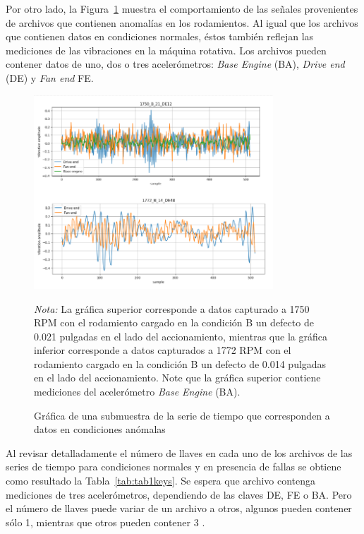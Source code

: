 \documentclass[11pt,a4paper,spanish]{book}
\numberwithin{equation}{chapter}
\numberwithin{figure}{chapter}
\begin{document}
Por otro lado, la Figura~\ref{fig:figAnomalySeries} muestra el comportamiento de las señales 
provenientes de archivos que contienen anomalías en los rodamientos. Al igual que los archivos
que contienen datos en condiciones normales, éstos también reflejan las mediciones de las 
vibraciones en la máquina rotativa. 
Los archivos pueden contener datos de uno, dos o tres acelerómetros: \textit{Base Engine} (BA), 
\textit{Drive end} (DE) y \textit{Fan end} FE.


\begin{figure}[H]
    \caption{Gráfica de una submuestra de la serie de tiempo que corresponden a datos en 
    condiciones anómalas}
    \centering
    \includegraphics[width=0.8\textwidth]{media/dataset/anomaly-series.png}
    \label{fig:figAnomalySeries}
    \parbox{\textwidth}{\footnotesize \textit{Nota:} La gráfica superior corresponde a datos
    capturado a 1750 RPM con el rodamiento cargado en la condición B un 
    defecto de 0.021 pulgadas en el lado del accionamiento, mientras que la gráfica inferior
    corresponde a datos capturados a 1772 RPM con 
    el rodamiento cargado en la condición B un defecto de 0.014 pulgadas en el lado del 
    accionamiento. Note que la gráfica superior contiene mediciones del acelerómetro 
    \textit{Base Engine} (BA). }
\end{figure}


Al revisar detalladamente el número de llaves en cada uno de los archivos de las series de tiempo 
para condiciones normales y en presencia de fallas se obtiene como resultado la Tabla~\ref{tab:tab1keys}. 
Se espera que archivo contenga mediciones de tres acelerómetros, dependiendo de las claves DE, 
FE o BA. Pero el número de llaves puede variar de un archivo a otros, algunos pueden 
contener sólo 1, mientras que otros pueden contener 3 \cite{rigas2024marine}.
\end{document}
